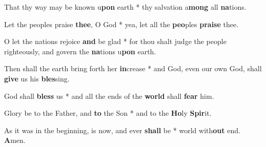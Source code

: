 \begin{multicols}{2}
	That thy way may be known u\textbf{pon} earth * thy salvation a\textbf{mong} all \textbf{na}tions.
	
	Let the peoples praise \textbf{thee}, O God * yea, let all the \textbf{peo}ples \textbf{praise} thee.
	
	O let the nations rejoice \textbf{and} be glad * for thou shalt judge the people righteously, and govern the \textbf{na}tions u\textbf{pon} earth.
	
	Then shall the earth bring forth her \textbf{in}crease * and God, even our own God, shall \textbf{give} us his \textbf{bles}sing.
	
	God shall \textbf{bless} us * and all the ends of the \textbf{world} shall \textbf{fear} him.
	
	Glory be to the Father, and \textbf{to} the Son * and to the \textbf{Ho}ly \textbf{Spir}it.
	
	As it was in the beginning, is now, and ever \textbf{shall} be * world with\textbf{out} end. \textbf{A}men.
\end{multicols}